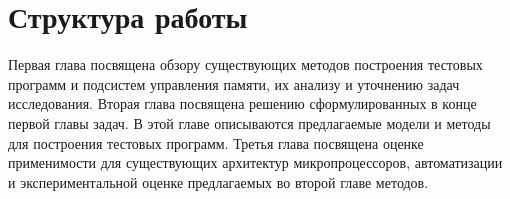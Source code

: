\documentclass[14pt]{extreport}
\makeatletter
\renewcommand\appendix{\par
  \setcounter{chapter}{0}%
  \setcounter{section}{0}%
  \def\@chapapp{\appendixname}%
  \def\thechapter{\@Asbuk\c@chapter}}
\makeatother
\begin{document}
\section*{Структура работы}
Первая глава посвящена обзору существующих методов построения тестовых программ и подсистем управления памяти, их анализу и уточнению задач исследования. Вторая глава посвящена решению сформулированных в конце первой главы задач. В этой главе описываются предлагаемые модели и методы для построения тестовых программ. Третья глава посвящена оценке применимости для существующих архитектур микропроцессоров, автоматизации и экспериментальной оценке предлагаемых во второй главе методов.










\pagebreak
\appendix
% 




\pagebreak




\end{document}
